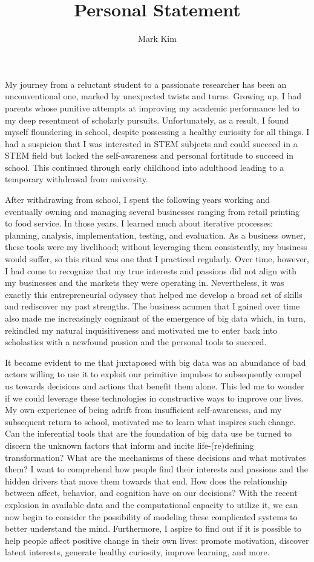 \documentclass[12pt]{article}
\author{Mark Kim}
\title{Personal Statement}
\begin{document}
\maketitle
My journey from a reluctant student to a passionate researcher has been an unconventional one, marked by unexpected twists and turns. Growing
up, I had parents whose punitive attempts at improving my academic performance led to my deep resentment of scholarly pursuits.
Unfortunately, as a result, I found myself floundering in school, despite possessing a healthy curiosity for all things.
I had a suspicion that I was interested in STEM subjects and could succeed in a STEM field but lacked the self-awareness and personal
fortitude to succeed in school.  This continued through early childhood into adulthood leading to a temporary withdrawal from university.

After withdrawing from school, I spent the following years working and eventually owning and managing several businesses ranging from
retail printing to food service.  In those years, I learned much about iterative processes: planning, analysis, implementation, testing, and
evaluation.  As a business owner, these tools were my livelihood; without leveraging them consistently, my business would suffer, so this
ritual was one that I practiced regularly. Over time, however, I had come to recognize that my true interests and passions did not align
with my businesses and the markets they were operating in. Nevertheless, it was exactly this entrepreneurial odyssey that helped me develop
a broad set of skills and rediscover my past strengths.  The business acumen that I gained over time also made me increasingly cognizant of
the emergence of big data which, in turn, rekindled my natural inquisitiveness and motivated me to enter back into scholastics with a
newfound passion and the personal tools to succeed.

It became evident to me that juxtaposed with big data was an abundance of bad actors willing to use it to exploit our primitive
impulses to subsequently compel us towards decisions and actions that benefit them alone. This led me to wonder if we could leverage these
technologies in constructive ways to improve our lives. My own experience of being adrift from insufficient self-awareness, and my subsequent
return to school, motivated me to learn what inspires such change. Can the inferential tools that are the foundation of big data use be
turned to discern the unknown factors that inform and incite life-(re)defining transformation?  What are the mechanisms of these decisions
and what motivates them?  I want to comprehend how people find their interests and passions and the hidden drivers that move them towards
that end. How does the relationship between affect, behavior, and cognition have on our decisions?  With the recent explosion in available
data and the computational capacity to utilize it, we can now begin to consider the possibility of modeling these complicated systems to
better understand the mind.  Furthermore, I aspire to find out if it is possible to help people affect positive change in their own lives:
promote motivation, discover latent interests, generate healthy curiosity, improve learning, and more.
\end{document}
